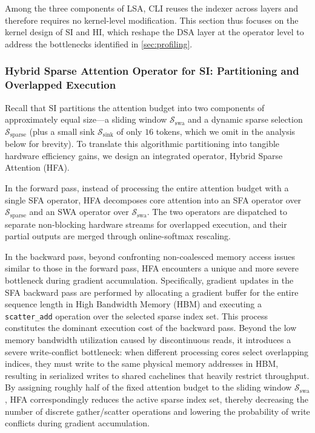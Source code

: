 \documentclass{article}
\begin{document}
Among the three components of LSA, CLI reuses the indexer across layers and therefore requires no kernel-level modification. This section thus focuses on the kernel design of SI and HI, which reshape the DSA layer at the operator level to address the bottlenecks identified in \cref{sec:profiling}.

\subsubsection{Hybrid Sparse Attention Operator for SI: Partitioning and Overlapped Execution}
Recall that SI partitions the attention budget into two components of approximately equal size---a sliding window $\mathcal{S}_{\text{swa}}$ and a dynamic sparse selection $\mathcal{S}_{\text{sparse}}$ (plus a small sink $\mathcal{S}_{\text{sink}}$ of only $16$ tokens, which we omit in the analysis below for brevity). To translate this algorithmic partitioning into tangible hardware efficiency gains, we design an integrated operator, Hybrid Sparse Attention (HFA).

In the forward pass, instead of processing the entire attention budget with a single SFA operator, HFA decomposes core attention into an SFA operator over $\mathcal{S}_{\text{sparse}}$ and an SWA operator over $\mathcal{S}_{\text{swa}}$. The two operators are dispatched to separate non-blocking hardware streams for overlapped execution, and their partial outputs are merged through online-softmax rescaling.

In the backward pass, beyond confronting non-coalesced memory access issues similar to those in the forward pass, HFA encounters a unique and more severe bottleneck during gradient accumulation. Specifically, gradient updates in the SFA backward pass are performed by allocating a gradient buffer for the entire sequence length in High Bandwidth Memory (HBM) and executing a \texttt{scatter\_add} operation over the selected sparse index set. This process constitutes the dominant execution cost of the backward pass. Beyond the low memory bandwidth utilization caused by discontinuous reads, it introduces a severe write-conflict bottleneck: when different processing cores select overlapping indices, they must write to the same physical memory addresses in HBM, resulting in serialized writes to shared cachelines that heavily restrict throughput. By assigning roughly half of the fixed attention budget to the sliding window $\mathcal{S}_{\text{swa}}$, HFA correspondingly reduces the active sparse index set, thereby decreasing the number of discrete gather/scatter operations and lowering the probability of write conflicts during gradient accumulation.
\end{document}
